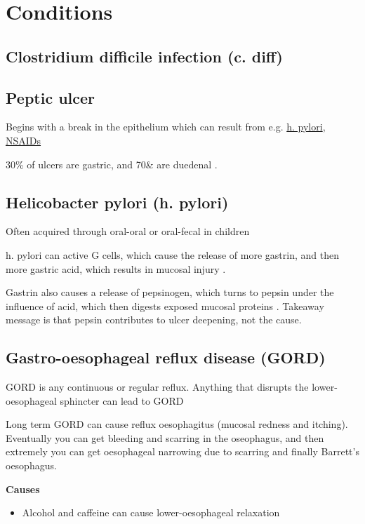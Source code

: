 \chapter{Conditions}

\section{Clostridium difficile infection (c. diff)}
\label{cond:c-diff}

\section{Peptic ulcer}
\label{cond:peptic_ulcer}

Begins with a break in the epithelium which can result from e.g. \hyperref[cond:h-pylori]{h. pylori}, \hyperref[drugclass:NSAIDs]{NSAIDs}

30\% of ulcers are gastric, and 70\& are duedenal \cite[7:32]{CobboldPepticUlcerDisease}.

\section{Helicobacter pylori (h. pylori)}
\label{cond:h-pylori}

Often acquired through oral-oral or oral-fecal in children \cite{CobboldPepticUlcerDisease}

h. pylori can active G cells, which cause the release of more gastrin, and then more gastric acid, which results in mucosal injury \cite[t. 5:50]{CobboldPepticUlcerDisease}. 

Gastrin also causes a release of pepsinogen, which turns to pepsin under the influence of acid, which then digests exposed mucosal proteins \cite[t. 6:47]{CobboldPepticUlcerDisease}. Takeaway message is that pepsin contributes to ulcer deepening, not the cause. 

\section{Gastro-oesophageal reflux disease (GORD)}

GORD is any continuous or regular reflux. Anything that disrupts the lower-oesophageal sphincter can lead to GORD

Long term GORD can cause reflux oesophagitus (mucosal redness and itching). Eventually you can get bleeding and scarring in the oseophagus, and then extremely you can get oesophageal narrowing due to scarring and finally Barrett's oesophagus. \cite[9:--]{CobboldGastroOesophagealRefluxDisease}

\textbf{Causes}

\begin{itemize}
    \item Alcohol and caffeine can cause lower-oesophageal relaxation
\end{itemize}